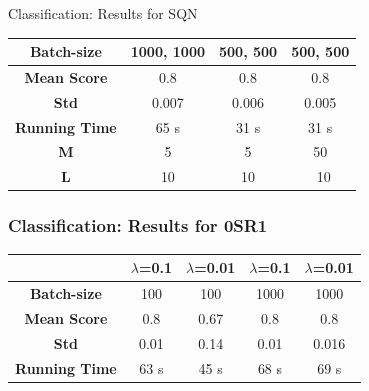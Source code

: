 \documentclass[10pt]{beamer}
\begin{document}

  
    	\begin{frame}{Classification: Results for SQN}
    		\begin{center}
    		\begin{tabular}{c|c||c|c}
    			
    			
    			\textbf{Batch-size} &  1000, 1000 &  500, 500&  500, 500 \\  \hline
    			\textbf{ Mean Score} &   0.8	&  0.8 & 0.8 \\	\hline  
    			\textbf{ Std} &  0.007 &  0.006 &  0.005\\ \hline
    			\textbf{ Running Time} &  65 s &  31 s & 31 s \\ \hline 
    			\textbf{ M} &  5 &  5 & 50 \\ \hline
    			\textbf{ L} &  10 &  10 &\ 10 \\ 
    			
    		\end{tabular}
    \end{center}
    \end{frame}
    \begin{frame}\frametitle{Classification: Results for 0SR1}
    	\begin{center}
    		\begin{tabular}{c|c|c||c|c}
    			
    			&\textbf{ $\lambda$=0.1 } &\textbf{  $\lambda$=0.01}&\textbf{ $\lambda$=0.1 } &\textbf{ $\lambda$=0.01} \\ \hline
    			\textbf{Batch-size} & 100 &  100&  1000 &  1000\\  \hline
    			\textbf{ Mean Score} &   0.8	&  0.67 & 0.8 & 0.8\\	\hline  
    			\textbf{ Std} &  0.01 &  0.14 &  0.01& 0.016\\ \hline
    			\textbf{ Running Time} &  63 s &  45 s & 68 s& 69 s \\ 
    			
    		\end{tabular}
    	\end{center}
    \end{frame}
\end{document}
